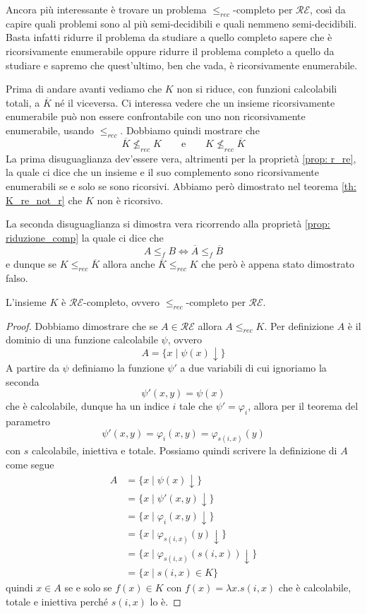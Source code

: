 Ancora più interessante è trovare un problema
$\leq_{rec}$-completo per $\mathcal{RE}$, così da capire quali
problemi sono al più semi-decidibili e quali nemmeno
semi-decidibili. Basta infatti ridurre il problema da studiare a
quello completo sapere che è ricorsivamente enumerabile oppure
ridurre il problema completo a quello da studiare e sapremo che
quest'ultimo, ben che vada, è ricorsivamente enumerabile.

Prima di andare avanti vediamo che $K$ non si riduce, con
funzioni calcolabili totali, a $\overline{K}$ né il viceversa.
Ci interessa vedere che un insieme ricorsivamente enumerabile
può non essere confrontabile con uno non ricorsivamente
enumerabile, usando $\leq_{rec}$. Dobbiamo quindi mostrare che
\[
	\overline{K} \not\leq_{rec} K \qquad \text{e}
	\qquad K \not\leq_{rec} \overline{K}
\]
La prima disuguaglianza dev'essere vera, altrimenti per la
proprietà \ref{prop: r_re}, la quale ci dice che un insieme e
il suo complemento sono ricorsivamente enumerabili se e solo se
sono ricorsivi. Abbiamo però dimostrato nel teorema
\ref{th: K_re_not_r} che $K$ non è ricorsivo.

La seconda disuguaglianza si dimostra vera ricorrendo alla
proprietà \ref{prop: riduzione_comp} la quale ci dice che
\[ A \leq_f B \iff \overline{A} \leq_f \overline{B} \]
e dunque se $K \leq_{rec} \overline{K}$ allora anche
$\overline{K} \leq_{rec} K$ che però è appena stato dimostrato
falso.

\begin{theorem}
	L'insieme $K$ è $\mathcal{RE}$-completo, ovvero
	$\leq_{rec}$-completo per $\mathcal{RE}$.
	\begin{proof}
		Dobbiamo dimostrare che se $A \in \mathcal{RE}$ allora
		$A \leq_{rec} K$. Per definizione $A$ è il dominio di
		una funzione calcolabile $\psi$, ovvero
		\[ A = \{ x \mid \psi (x) \downarrow \} \]
		A partire da $\psi$ definiamo la funzione $\psi'$ a due
		variabili di cui ignoriamo la seconda
		\[ \psi' (x, y) = \psi(x) \]
		che è calcolabile, dunque ha un indice $i$ tale che
		$\psi' = \varphi_i$, allora per il teorema del parametro
		\[ \psi' (x, y) = \varphi_i(x, y) = \varphi_{s(i, x)} (y) \]
		con $s$ calcolabile, iniettiva e totale. Possiamo quindi
		scrivere la definizione di $A$ come segue
		\begin{align*}
			A & = \{ x \mid \psi(x) \downarrow \}                    \\
			  & = \{ x \mid \psi'(x, y) \downarrow \}                \\
			  & = \{ x \mid \varphi_i(x, y) \downarrow \}            \\
			  & = \{ x \mid \varphi_{s(i, x)}(y) \downarrow \}       \\
			  & = \{ x \mid \varphi_{s(i, x)}(s(i, x)) \downarrow \} \\
			  & = \{ x \mid s(i, x) \in K \}
		\end{align*}
		quindi $x \in A$ se e solo se $f(x) \in K$ con
		$f(x) = \lambda x . s(i, x)$ che è calcolabile, totale
		e iniettiva perché $s(i, x)$ lo è.
	\end{proof}
\end{theorem}

